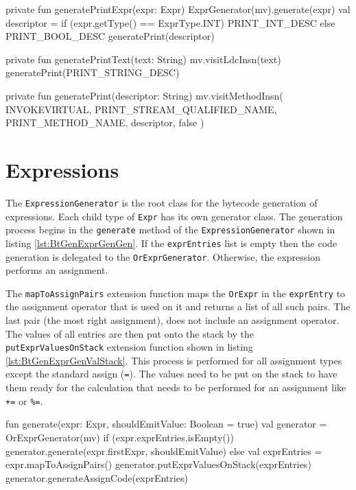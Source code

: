 \begin{KotlinCode}[float,numbers=none,caption=Code for the print generation methods of the \texttt{OutputStatGenerator}., label=lst:BtGenOutputStatGen]
private fun generatePrintExpr(expr: Expr) {
    ExprGenerator(mv).generate(expr)
    val descriptor = if (expr.getType() == ExprType.INT) {
        PRINT_INT_DESC
    }else {
        PRINT_BOOL_DESC
    }
    generatePrint(descriptor)
}

private fun generatePrintText(text: String) {
    mv.visitLdcInsn(text)
    generatePrint(PRINT_STRING_DESC)
}

private fun generatePrint(descriptor: String) {
    mv.visitMethodInsn(
        INVOKEVIRTUAL,
        PRINT_STREAM_QUALIFIED_NAME,
        PRINT_METHOD_NAME,
        descriptor,
        false
    )
}
\end{KotlinCode}


\section{Expressions}

The \verb|ExpressionGenerator| is the root class for the bytecode generation of expressions. Each child type of \verb|Expr| has its own generator class. The generation process begins in the \verb|generate| method of the \verb|ExpressionGenerator| shown in listing \ref{lst:BtGenExprGenGen}. If the \verb|exprEntries| list is empty then the code generation is delegated to the \verb|OrExprGenerator|. Otherwise, the expression performs an assignment. 

The \verb|mapToAssignPairs| extension function maps the \verb|OrExpr| in the \verb|exprEntry| to the assignment operator that is used on it and returns a list of all such pairs. The last pair (the most right assignment), does not include an assignment operator. The values of all entries are then put onto the stack by the \verb|putExprValuesOnStack| extension function shown in listing \ref{lst:BtGenExprGenValStack}. This process is performed for all assignment types except the standard assign (\verb|=|). The values need to be put on the stack to have them ready for the calculation that needs to be performed for an assignment like \verb|+=| or \verb|%=|. 



\begin{KotlinCode}[float,numbers=none,caption=Implementation of the \texttt{generate} method of the \texttt{ExpressionGenerator}., label=lst:BtGenExprGenGen]
fun generate(expr: Expr, shouldEmitValue: Boolean = true) {
    val generator = OrExprGenerator(mv)
    if (expr.exprEntries.isEmpty()) {
        generator.generate(expr.firstExpr, shouldEmitValue)
    } else {
        val exprEntries = expr.mapToAssignPairs()
        generator.putExprValuesOnStack(exprEntries)
        generator.generateAssignCode(exprEntries)
    }
}  
\end{KotlinCode}

